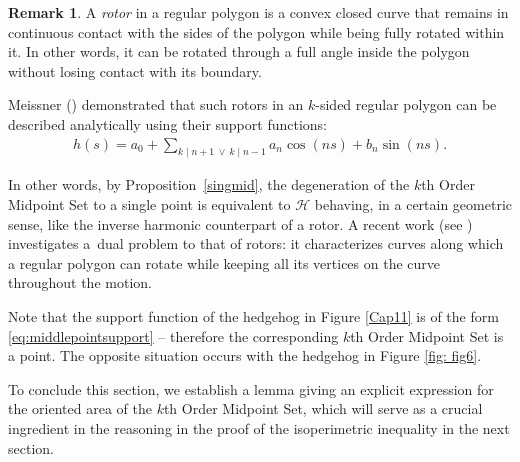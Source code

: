 \documentclass{amsart}
\theoremstyle{definition}
\newtheorem{rem}[thm]{Remark}
\numberwithin{equation}{section}
\begin{document}
\begin{rem}
    A \textit{rotor} in a regular polygon is a convex closed curve that remains in continuous contact with the sides of the polygon while being fully rotated within it. In other words, it can be rotated through a full angle inside the polygon without losing contact with its boundary. 
    
    Meissner (\cite{Meissner}) demonstrated that such rotors in an $k$-sided regular polygon can be described analytically using their support functions:
    \begin{align*}
    h(s) =a_0+ \sum_{ k\mid n+1\ \vee \ k\mid n-1} a_n\cos(ns) + b_n\sin(ns).
    \end{align*}

    In other words, by Proposition~\ref{singmid}, the degeneration of the $k$th Order Midpoint Set to a single point is equivalent to $\mathcal{H}$ behaving, in a certain geometric sense, like the inverse harmonic counterpart of a rotor. A recent work (see \cite{Rochera3}) investigates a~dual problem to that of rotors: it characterizes curves along which a regular polygon can rotate while keeping all its vertices on the curve throughout the motion.
\end{rem}

Note that the support function of the hedgehog in Figure \ref{Cap11} is of the form \eqref{eq:middlepointsupport} -- therefore the corresponding $k$th Order Midpoint Set is a point. The opposite situation occurs with the hedgehog in Figure \ref{fig: fig6}.

To conclude this section, we establish a lemma giving an explicit expression for the oriented area of the $k$th Order Midpoint Set, which will serve as a crucial ingredient in the reasoning in the proof of the isoperimetric inequality in the next section.
\end{document}

